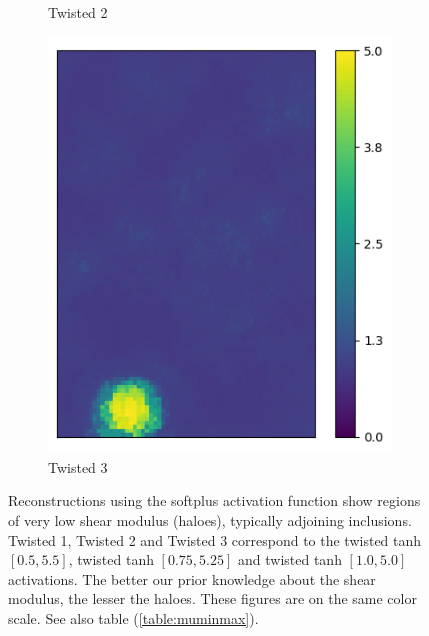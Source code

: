 \documentclass[10pt]{article}
\newcommand{\nhghaloesheight}{3.0cm}
\newcommand{\nhghaloeswidth}{0.19\linewidth}
\begin{document}
\begin{figure}[!h]
\begin{subfigure}[c]{\nhghaloeswidth}
    \caption{\label{fig:haloes_tanhp25} Twisted 2}        
  \end{subfigure}
  \begin{subfigure}[c]{\nhghaloeswidth}
    \centering
    \includegraphics[totalheight=\nhghaloesheight]{Figures/softplus_halos/ex1/mutanhshift0.png}
    \caption{\label{fig:haloes_tanhp0} Twisted 3}    
  \end{subfigure}     
  \caption{\label{fig:haloes} Reconstructions using the softplus activation function show regions of very low shear modulus (haloes), typically adjoining inclusions. Twisted 1, Twisted 2 and Twisted 3 correspond to the twisted tanh $[0.5, 5.5]$, twisted tanh $[0.75,5.25]$ and twisted tanh $[1.0,5.0]$ activations. The better our prior knowledge about the shear modulus, the lesser the haloes. These figures are on the same color scale. See also table (\ref{table:muminmax}).}
\end{figure}
%
\end{document}
